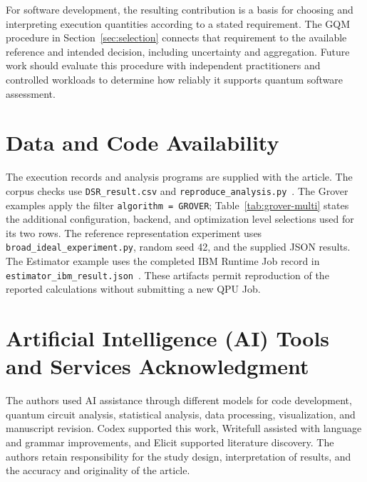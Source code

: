 \documentclass[10pt,conference]{IEEEtran}
\begin{document}
For software development, the resulting contribution is a basis for choosing and interpreting execution quantities according to a stated requirement. The GQM procedure in Section~\ref{sec:selection} connects that requirement to the available reference and intended decision, including uncertainty and aggregation. Future work should evaluate this procedure with independent practitioners and controlled workloads to determine how reliably it supports quantum software assessment.

\section{Data and Code Availability}

The execution records and analysis programs are supplied with the article. The corpus checks use \texttt{DSR\_result.csv} and \texttt{reproduce\_analysis.py}~\cite{qwardGroverData2026}. The Grover examples apply the filter \texttt{algorithm = GROVER}; Table~\ref{tab:grover-multi} states the additional configuration, backend, and optimization level selections used for its two rows. The reference representation experiment uses \texttt{broad\_ideal\_experiment.py}, random seed 42, and the supplied JSON results. The Estimator example uses the completed IBM Runtime Job record in \texttt{estimator\_ibm\_result.json}~\cite{qwardEstimatorData2026}. These artifacts permit reproduction of the reported calculations without submitting a new QPU Job.

\section{Artificial Intelligence (AI) Tools and Services Acknowledgment}

The authors used AI assistance through different models for code development, quantum circuit analysis, statistical analysis, data processing, visualization, and manuscript revision. Codex supported this work, Writefull assisted with language and grammar improvements, and Elicit supported literature discovery. The authors retain responsibility for the study design, interpretation of results, and the accuracy and originality of the article.



\end{document}
